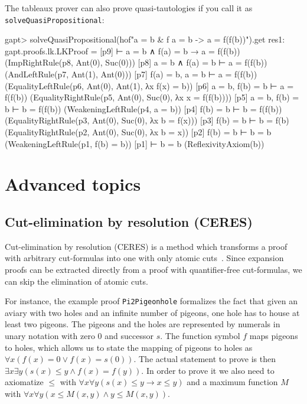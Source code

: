 \documentclass[a4paper,11pt]{book}
\newcommand{\impl}{\to} %
\renewcommand{\land}{\wedge}
\renewcommand{\lor}{\vee}
\begin{document}
The tableaux prover can also prove quasi-tautologies if you call it as \texttt{solveQuasiPropositional}:
\begin{clilisting}
gapt> solveQuasiPropositional(hof"a = b & f a = b -> a = f(f(b))").get
res1: gapt.proofs.lk.LKProof =
[p9]  ⊢ a = b ∧ f(a) = b → a = f(f(b))    (ImpRightRule(p8, Ant(0), Suc(0)))
[p8] a = b ∧ f(a) = b ⊢ a = f(f(b))    (AndLeftRule(p7, Ant(1), Ant(0)))
[p7] f(a) = b, a = b ⊢ a = f(f(b))    (EqualityLeftRule(p6, Ant(0), Ant(1), λx f(x) = b))
[p6] a = b, f(b) = b ⊢ a = f(f(b))    (EqualityRightRule(p5, Ant(0), Suc(0), λx x = f(f(b))))
[p5] a = b, f(b) = b ⊢ b = f(f(b))    (WeakeningLeftRule(p4, a = b))
[p4] f(b) = b ⊢ b = f(f(b))    (EqualityRightRule(p3, Ant(0), Suc(0), λx b = f(x)))
[p3] f(b) = b ⊢ b = f(b)    (EqualityRightRule(p2, Ant(0), Suc(0), λx b = x))
[p2] f(b) = b ⊢ b = b    (WeakeningLeftRule(p1, f(b) = b))
[p1]  ⊢ b = b    (ReflexivityAxiom(b))

\end{clilisting}


\chapter{Advanced topics}


\section{Cut-elimination by resolution (CERES)}\label{sec:ceres}

Cut-elimination by resolution (CERES) is a method which transforms a
proof with arbitrary cut-formulas into one with only atomic cuts~\cite{Baaz00CutElimination,Baaz2011}. Since
expansion proofs can be extracted directly from a proof with quantifier-free
cut-formulas, we can skip the elimination of atomic cuts.

For instance, the example proof \texttt{Pi2Pigeonhole} formalizes
the fact that given an aviary with two holes and an infinite number
of pigeons, one hole has to house at least two pigeons. The pigeons and
the holes are represented by numerals in unary notation with zero $0$ and
successor $s$. The function symbol $f$ maps pigeons to holes, which allows us
to state the mapping of pigeons to holes as
$\forall x (f(x) = 0 \lor f(x) = s(0))$. The actual statement to prove is then
$\exists x \exists y (s(x) \leq y \land f(x) = f(y))$. In order to prove it
we also need to axiomatize $\leq$ with
$\forall x \forall y (s(x) \leq y \impl x \leq y)$ 
and a maximum function $M$ with $\forall x \forall y (x \leq M(x,y) \land y\leq M(x,y))$.
\end{document}
